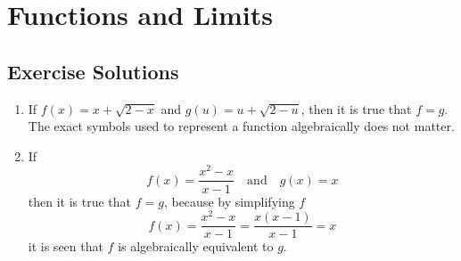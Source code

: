 \documentclass[10pt]{article}
\begin{document}
\section{Functions and Limits}
\subsection{Exercise Solutions}

\begin{enumerate}

    \item If \( f(x) = x + \sqrt{2 - x} \) and \( g(u) = u + \sqrt{2 - u} \), then it is true that \( f = g \). The exact symbols used to represent a function algebraically does not matter.

    \item If
          \[ f(x) = \frac{x^2 - x}{x - 1} \quad \text{and} \quad g(x) = x \]
          then it is true that \( f = g \), because by simplifying \( f \)
          \[ f(x) = \frac{x^2 - x}{x - 1} = \frac{x(x - 1)}{x - 1} = x \]
          it is seen that \( f \) is algebraically equivalent to \(g\).

\end{enumerate}
\end{document}
